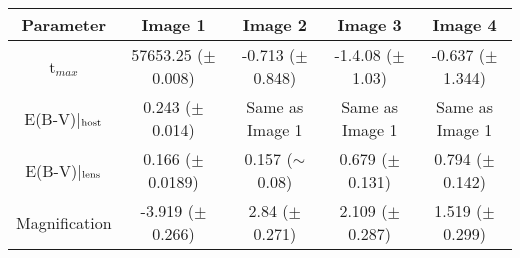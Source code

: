 \begin{table*}
\centering
\begin{tabular}{|c|c|c|c|c|}
\hline
Parameter & Image 1 & Image 2 &  Image 3 & Image 4 \\
\hline\hline
t$_{max}$ &  57653.25 ($\pm$ 0.008) & -0.713 ($\pm$  0.848) & -1.4.08  ($\pm$ 1.03) & -0.637 ($\pm$ 1.344) \\
E(B-V)|$_{\rm host}$ & 0.243 ($\pm$ 0.014) & Same as Image 1 & Same as Image 1 & Same as Image 1  \\
E(B-V)|$_{\rm lens}$ &  0.166 ($\pm$ 0.0189) &  0.157 ($\sim$ 0.08) & 0.679 ($\pm$ 0.131) & 0.794 ($\pm$ 0.142) \\
Magnification & -3.919 ($\pm$ 0.266) & 2.84 ($\pm$ 0.271) &  2.109 ($\pm$ 0.287) & 1.519 ($\pm$ 0.299) 
\\

\hline
\end{tabular}
\label{tab:params}
\end{table*}